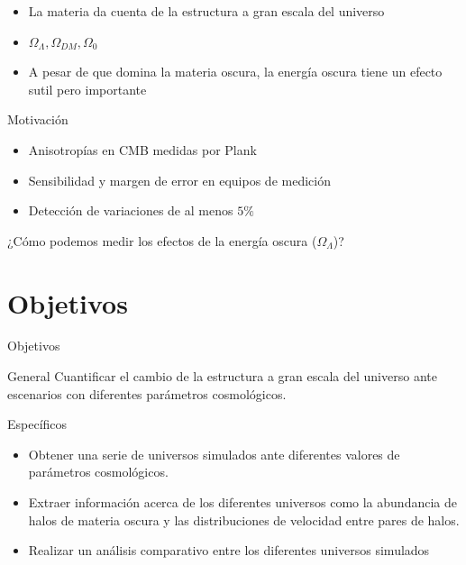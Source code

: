 \documentclass{beamer}
\begin{document}
\begin{frame}
	\begin{block}{}
		\begin{itemize}
			\item La materia da cuenta de la estructura a gran escala del universo
			\item $\Omega_\Lambda,\Omega_{DM}, \Omega_0$
			\item A pesar de que domina la materia oscura, la energía oscura tiene un efecto sutil pero importante
		\end{itemize}
	\end{block}
\end{frame}
\begin{frame}{Motivación}
	 \begin{itemize}
	 	\item Anisotropías en CMB medidas por Plank
	 	\item Sensibilidad y margen de error en equipos de medición
	 	\item Detección de variaciones de al menos $5\%$
	\end{itemize}	 	
	
	\begin{block}{}
		\centering
		\LARGE{¿Cómo podemos medir los efectos de la energía oscura ($\Omega_\Lambda$)?}	
	\end{block}

\end{frame}
\section{Objetivos}
\begin{frame}{Objetivos}
	\begin{block}{General}
		Cuantificar el cambio de la estructura a gran escala del universo ante escenarios con diferentes parámetros cosmológicos.
	\end{block}
	\begin{block}{Específicos}
		\begin{itemize}
			\item Obtener una serie de universos simulados ante diferentes valores de parámetros cosmológicos.
			\item Extraer información acerca de los diferentes universos como la abundancia de halos de materia oscura y las distribuciones de velocidad entre pares de halos.
			\item Realizar un análisis comparativo entre los diferentes universos simulados
		\end{itemize}	
	\end{block}
\end{frame}
\end{document}
